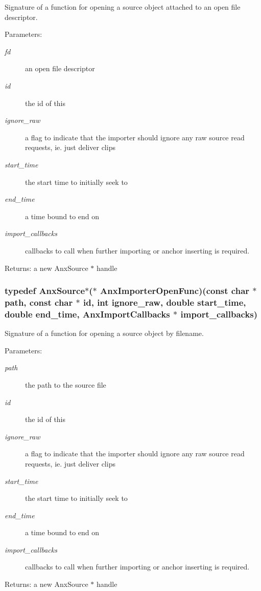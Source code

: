 Signature of a function for opening a source object attached to an open file descriptor. 

\begin{Desc}
\item[Parameters:]
\begin{description}
\item[{\em fd}]an open file descriptor \item[{\em id}]the id of this \item[{\em ignore\_\-raw}]a flag to indicate that the importer should ignore any raw source read requests, ie. just deliver clips \item[{\em start\_\-time}]the start time to initially seek to \item[{\em end\_\-time}]a time bound to end on \item[{\em import\_\-callbacks}]callbacks to call when further importing or anchor inserting is required. \end{description}
\end{Desc}
\begin{Desc}
\item[Returns:]a new Anx\-Source $\ast$ handle \end{Desc}
\subsubsection{\setlength{\rightskip}{0pt plus 5cm}typedef {\bf Anx\-Source}$\ast$($\ast$ {\bf Anx\-Importer\-Open\-Func})(const char $\ast$ path, const char $\ast$ id, int ignore\_\-raw, double start\_\-time, double end\_\-time, Anx\-Import\-Callbacks $\ast$ import\_\-callbacks)}\label{anx__import_8h_a3}


Signature of a function for opening a source object by filename. 

\begin{Desc}
\item[Parameters:]
\begin{description}
\item[{\em path}]the path to the source file \item[{\em id}]the id of this \item[{\em ignore\_\-raw}]a flag to indicate that the importer should ignore any raw source read requests, ie. just deliver clips \item[{\em start\_\-time}]the start time to initially seek to \item[{\em end\_\-time}]a time bound to end on \item[{\em import\_\-callbacks}]callbacks to call when further importing or anchor inserting is required. \end{description}
\end{Desc}
\begin{Desc}
\item[Returns:]a new Anx\-Source $\ast$ handle \end{Desc}
